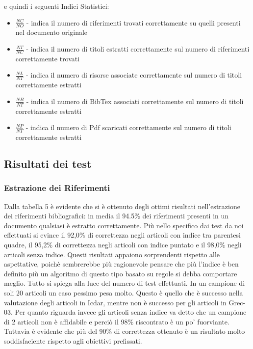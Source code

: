 e quindi i seguenti Indici Statistici:
\begin{itemize}
 \item \textbf{$\frac{NC}{NO}$} - indica il numero di riferimenti trovati correttamente su quelli presenti nel documento originale
 \item \textbf{$\frac{NT}{NC}$} - indica il numero di titoli estratti correttamente sul numero di riferimenti correttamente trovati
 \item \textbf{$\frac{NL}{NT}$} - indica il numero di risorse associate correttamente sul numero di titoli correttamente estratti
 \item \textbf{$\frac{NB}{NT}$} - indica il numero di BibTex associati correttamente sul numero di titoli correttamente estratti
 \item \textbf{$\frac{NP}{NT}$} - indica il numero di Pdf scaricati correttamente sul numero di titoli correttamente estratti
\end{itemize}

\subsection{Risultati dei test}

\subsubsection{Estrazione dei Riferimenti}
Dalla tabella 5 è evidente che si è ottenuto degli ottimi risultati nell'estrazione dei riferimenti bibliografici: in media il 94.5\% dei riferimenti presenti in un documento qualsiasi è estratto correttamente. Più nello specifico dai test da noi effettuati si evince il 92,0\% di correttezza negli articoli con indice tra parentesi quadre, il 95,2\% di correttezza negli articoli con indice puntato e il 98,0\% negli articoli senza indice. Questi risultati appaiono sorprendenti rispetto alle aspettative, poichè sembrerebbe più ragionevole pensare che più l'indice è ben definito più un algoritmo di questo tipo basato su regole si debba comportare meglio. Tutto si spiega alla luce del numero di test effettuati. In un campione di soli 20 articoli un caso pessimo pesa molto. Questo è quello che è successo nella valutazione degli articoli in Icdar, mentre non è successo per gli articoli in Grec-03. Per quanto riguarda invece gli articoli senza indice va detto che un campione di 2 articoli non è affidabile e perciò il 98\% riscontrato è un po' fuorviante. Tuttavia è evidente che più del 90\% di correttezza ottenuto è un risultato molto soddisfaciente rispetto agli obiettivi prefissati. 


